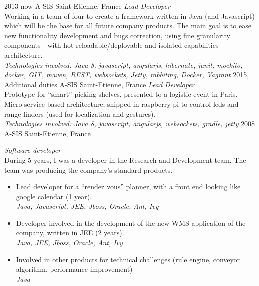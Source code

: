 \documentclass[]{k-cv} %
\begin{document}
\begin{entrylist}
\entry
{2013 \to now}
{A-SIS}
{Saint-Etienne, France}
{\emph{Lead Developer} \\
Working in a team of four to create a framework written in Java (and Javascript) which
 will be the base for all future company products.
The main goal is to ease new functionality development and bugs correction,
  using fine granularity components - with hot reloadable/deployable and isolated capabilities - architecture. \\
\emph{
Technologies involved:
Java 8, javascript, angularjs, hibernate, junit, mockito, docker,
GIT, maven, REST, websockets, Jetty, rabbitmq, Docker, Vagrant
}}
\entry
{2015, Additional duties}
{A-SIS}
{Saint-Etienne, France}
{\emph{Lead Developer} \\
Prototype for “smart” picking shelves, presented to a logistic event in Paris.
Micro-service based architecture, shipped in raspberry pi to control leds and range finders
(used for localization and gestures). \\
\emph{
Technologies involved:
Java 8, javascript, angularjs, websockets,  gradle, jetty
}}
\entry
{2008 }
{A-SIS}
{Saint-Etienne, France}
{\emph{Software developer} \\
During 5 years, I was a developer in the Research and Development team.
The team was producing the company’s standard products.
\begin{itemize}
\item
Lead developer for a “rendez vous” planner, with a front end looking like google calendar (1 year). \\
\emph{Java, Javascript, JEE, Jboss, Oracle, Ant, Ivy}
\item
Developer involved in the development of the new WMS application of the company, written in JEE (2 years). \\
\emph{Java, JEE, Jboss, Oracle, Ant, Ivy}
\item
Involved in other products for technical challenges (rule engine, conveyor algorithm, performance improvement) \\
\emph{Java}
\end{itemize}}
\end{entrylist}

\clearpage

\end{document}
